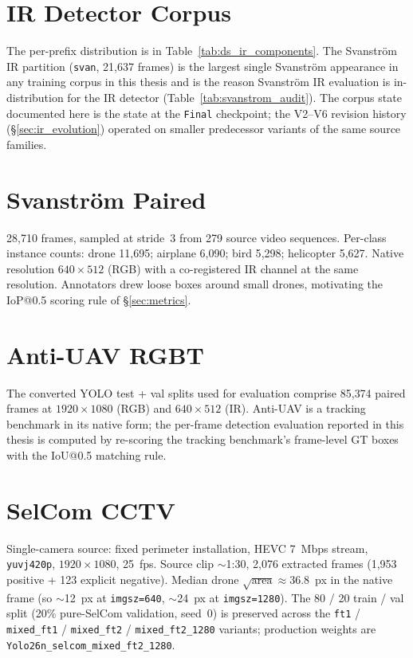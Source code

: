 \documentclass[12pt,a4paper,oneside,openright]{book}
\begin{document}
\section{IR Detector Corpus}

The per-prefix distribution is in Table~\ref{tab:ds_ir_components}. The Svanstr\"om IR partition (\texttt{svan}, 21{,}637 frames) is the largest single Svanstr\"om appearance in any training corpus in this thesis and is the reason Svanstr\"om IR evaluation is in-distribution for the IR detector (Table~\ref{tab:svanstrom_audit}). The corpus state documented here is the state at the \texttt{Final} checkpoint; the V2--V6 revision history (\S\ref{sec:ir_evolution}) operated on smaller predecessor variants of the same source families.

\section{Svanstr\"om Paired}

28{,}710 frames, sampled at stride~3 from 279 source video sequences. Per-class instance counts: drone 11{,}695; airplane 6{,}090; bird 5{,}298; helicopter 5{,}627. Native resolution $640{\times}512$ (RGB) with a co-registered IR channel at the same resolution. Annotators drew loose boxes around small drones, motivating the IoP@0.5 scoring rule of \S\ref{sec:metrics}.

\section{Anti-UAV RGBT}

The converted YOLO test + val splits used for evaluation comprise 85{,}374 paired frames at $1920{\times}1080$ (RGB) and $640{\times}512$ (IR). Anti-UAV is a tracking benchmark in its native form; the per-frame detection evaluation reported in this thesis is computed by re-scoring the tracking benchmark's frame-level GT boxes with the IoU@0.5 matching rule.

\section{SelCom CCTV}

Single-camera source: fixed perimeter installation, HEVC 7~Mbps stream, \texttt{yuvj420p}, $1920{\times}1080$, 25~fps. Source clip $\sim$1:30, 2{,}076 extracted frames (1{,}953 positive + 123 explicit negative). Median drone $\sqrt{\text{area}} \approx 36.8$~px in the native frame (so $\sim$12~px at \texttt{imgsz=640}, $\sim$24~px at \texttt{imgsz=1280}). The 80 / 20 train / val split (20\% pure-SelCom validation, seed~0) is preserved across the \texttt{ft1} / \texttt{mixed\_ft1} / \texttt{mixed\_ft2} / \texttt{mixed\_ft2\_1280} variants; production weights are \texttt{Yolo26n\_selcom\_mixed\_ft2\_1280}.
\end{document}
